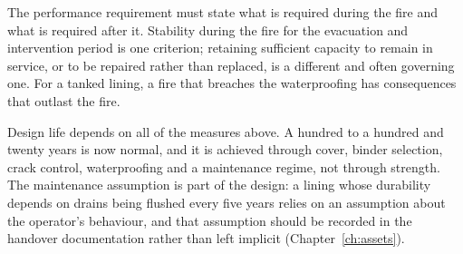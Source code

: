 The performance requirement must state what is required during the fire and
what is required after it. Stability during the fire for the evacuation and
intervention period is one criterion; retaining sufficient capacity to remain
in service, or to be repaired rather than replaced, is a different and often
governing one. For a tanked lining, a fire that breaches the waterproofing has
consequences that outlast the fire.

Design life depends on all of the measures above. A hundred to a hundred and twenty years
is now normal, and it is achieved through cover, binder selection, crack
control, waterproofing and a maintenance regime, not through strength. The
maintenance assumption is part of the design: a lining whose durability
depends on drains being flushed every five years relies on an assumption
about the operator's behaviour, and that assumption should be recorded in the
handover documentation rather than left implicit
(Chapter~\ref{ch:assets}).

\chapterreferences
